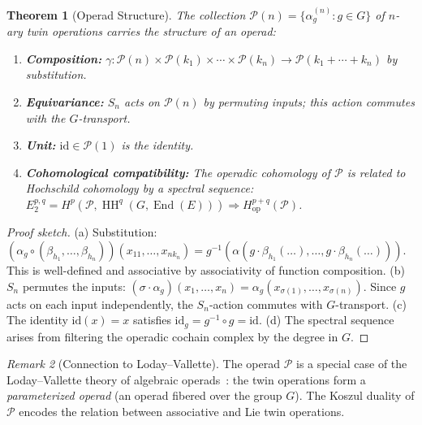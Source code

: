 \documentclass[11pt,twocolumn]{article}
\theoremstyle{plain}\newtheorem{theorem}{Theorem}\newtheorem{proposition}[theorem]{Proposition}\newtheorem{corollary}[theorem]{Corollary}\newtheorem{lemma}[theorem]{Lemma}
\theoremstyle{definition}\newtheorem{definition}[theorem]{Definition}\newtheorem{example}[theorem]{Example}
\theoremstyle{remark}\newtheorem{remark}[theorem]{Remark}
\newcommand{\HH}{\operatorname{HH}}
\newcommand{\End}{\operatorname{End}}
\begin{document}
\begin{theorem}[Operad Structure]\label{thm:operad}
The collection $\mathcal{P}(n) = \{\alpha_g^{(n)} : g \in G\}$ of $n$-ary twin operations carries the structure of an operad:
\begin{enumerate}[label=(\alph*)]
    \item \textbf{Composition:} $\gamma: \mathcal{P}(n) \times \mathcal{P}(k_1) \times \cdots \times \mathcal{P}(k_n) \to \mathcal{P}(k_1 + \cdots + k_n)$ by substitution.
    \item \textbf{Equivariance:} $S_n$ acts on $\mathcal{P}(n)$ by permuting inputs; this action commutes with the $G$-transport.
    \item \textbf{Unit:} $\mathrm{id} \in \mathcal{P}(1)$ is the identity.
    \item \textbf{Cohomological compatibility:} The operadic cohomology of $\mathcal{P}$ is related to Hochschild cohomology by a spectral sequence:
    $E_2^{p,q} = H^p(\mathcal{P}, \HH^q(G, \End(E))) \Rightarrow H^{p+q}_{\mathrm{op}}(\mathcal{P})$.
\end{enumerate}
\end{theorem}

\begin{proof}[Proof sketch]
(a) Substitution: $(\alpha_g \circ (\beta_{h_1}, \ldots, \beta_{h_n}))(x_{11}, \ldots, x_{nk_n}) = g^{-1}(\alpha(g \cdot \beta_{h_1}(\ldots), \ldots, g \cdot \beta_{h_n}(\ldots)))$. This is well-defined and associative by associativity of function composition.
(b) $S_n$ permutes the inputs: $(\sigma \cdot \alpha_g)(x_1, \ldots, x_n) = \alpha_g(x_{\sigma(1)}, \ldots, x_{\sigma(n)})$. Since $g$ acts on each input independently, the $S_n$-action commutes with $G$-transport.
(c) The identity $\mathrm{id}(x) = x$ satisfies $\mathrm{id}_g = g^{-1} \circ g = \mathrm{id}$.
(d) The spectral sequence arises from filtering the operadic cochain complex by the degree in $G$.
\end{proof}

\begin{remark}[Connection to Loday--Vallette]
The operad $\mathcal{P}$ is a special case of the Loday--Vallette theory of algebraic operads~\cite{loday2012}: the twin operations form a \emph{parameterized operad} (an operad fibered over the group $G$). The Koszul duality of $\mathcal{P}$ encodes the relation between associative and Lie twin operations.
\end{remark}


\end{document}
